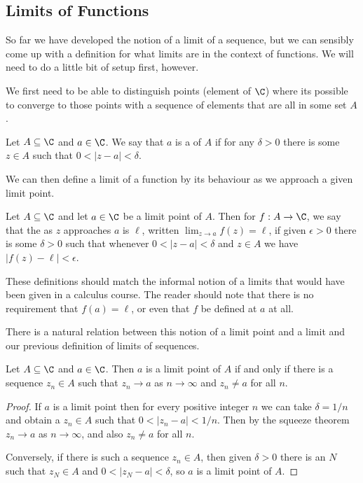 \subsection{Limits of Functions}\label{sec:lim-of-func}

So far we have developed the notion of a limit of a sequence, but we can sensibly come up with a definition for what limits are in the context of functions. We will need to do a little bit of setup first, however.

We first need to be able to distinguish points (element of $\C$) where its possible to converge to those points with a sequence of elements that are all in some set $A$.

\begin{definition}
	Let $A \subseteq \C$ and $a \in \C$. We say that $a$ is a  of $A$ if for any $\delta > 0$ there is some $z \in A$ such that $0 < |z - a| < \delta$.
\end{definition}

We can then define a limit of a function by its behaviour as we approach a given limit point.

\begin{definition}
	Let $A \subseteq \C$ and let $a \in \C$ be a limit point of $A$. Then for $f: A \rightarrow \C$, we say that the  as $z$ approaches $a$ is $\ell$, written $\displaystyle\lim_{z \to a} f(z) = \ell$, if given $\epsilon > 0$ there is some $\delta > 0$ such that whenever $0 < |z - a| < \delta$ and $z \in A$ we have $|f(z) - \ell| < \epsilon$.
\end{definition}


These definitions should match the informal notion of a limits that would have been given in a calculus course. The reader should note that there is no requirement that $f(a) = \ell$, or even that $f$ be defined at $a$ at all.

There is a natural relation between this notion of a limit point and a limit and our previous definition of limits of sequences.

\begin{proposition}
	Let $A \subseteq \C$ and $a \in \C$. Then $a$ is a limit point of $A$ if and only if there is a sequence $z_n \in A$ such that $z_n \rightarrow a$ as $n \rightarrow \infty$ and $z_n \neq a$ for all $n$. 
\end{proposition}
\begin{proof}
	If $a$ is a limit point then for every positive integer $n$ we can take $\delta = 1/n$ and obtain a $z_n \in A$ such that $0 < |z_n - a| < 1/n$. Then by the squeeze theorem $z_n \rightarrow a$ as $n \rightarrow \infty$, and also $z_n \neq a$ for all $n$.

	Conversely, if there is such a sequence $z_n \in A$, then given $\delta > 0$ there is an $N$ such that $z_N \in A$ and $0 < |z_N - a| < \delta$, so $a$ is a limit point of $A$.
\end{proof}

